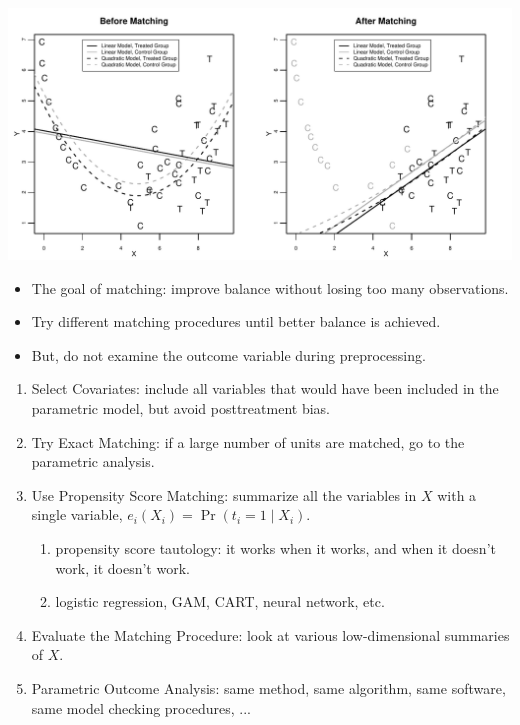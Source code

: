 \documentclass[20pt,landscape,pdftex]{foils}
\begin{document}
\begin{center}
  \includegraphics{figs/olspanel-thick.pdf}\pause
\end{center}



\hypersetup{pdfpagetransition=Replace}

\begin{itemize}
\zerolistvertdimens 
\item The goal of matching: improve balance without losing too many
  observations.\pause

\item Try different matching procedures until better balance is
  achieved.\pause

\item But, do not examine the outcome variable during
  preprocessing.\pause
\end{itemize}
  
\begin{enumerate}
\item Select Covariates: include all variables that would have been
  included in the parametric model, but avoid posttreatment
  bias.\pause
  
\item Try Exact Matching: if a large number of units are matched, go
  to the parametric analysis.\pause
  
\item Use Propensity Score Matching: summarize all the variables in
  $X$ with a single variable, $e_i(X_i)=\Pr(t_i=1\mid X_i)$.\pause
  
  \begin{enumerate}
  \item propensity score tautology: it works when it works, and when
    it doesn't work, it doesn't work.\pause

  \item logistic regression, GAM, CART, neural network, etc.\pause
    
  \end{enumerate}

\item Evaluate the Matching Procedure: look at various low-dimensional
  summaries of $X$.\pause
\item Parametric Outcome Analysis: same method, same algorithm, same
  software, same model checking procedures, ... \pause
\end{enumerate}
\end{document}
